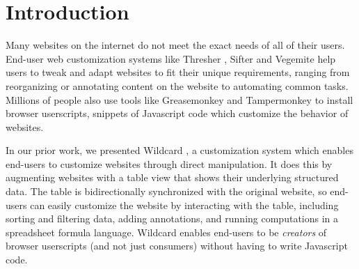 \documentclass[sigconf,10pt]{acmart}
\begin{document}



\maketitle

\hypertarget{sec:introduction}{%
\section{Introduction}\label{sec:introduction}}

Many websites on the internet do not meet the exact needs of all of
their users. End-user web customization systems like Thresher
\citep{hogue2005}, Sifter \citep{huynh2006} and Vegemite \citep{lin2009}
help users to tweak and adapt websites to fit their unique requirements,
ranging from reorganizing or annotating content on the website to
automating common tasks. Millions of people also use tools like
Greasemonkey \citep{zotero-90} and Tampermonkey \citep{zotero-92} to
install browser userscripts, snippets of Javascript code which customize
the behavior of websites.

In our prior work, we presented Wildcard \citep{litt2020a, litt2020b}, a
customization system which enables end-users to customize websites
through direct manipulation. It does this by augmenting websites with a
table view that shows their underlying structured data. The table is
bidirectionally synchronized with the original website, so end-users can
easily customize the website by interacting with the table, including
sorting and filtering data, adding annotations, and running computations
in a spreadsheet formula language. Wildcard enables end-users to be
\emph{creators} of browser userscripts (and not just consumers) without
having to write Javascript code.
\end{document}
